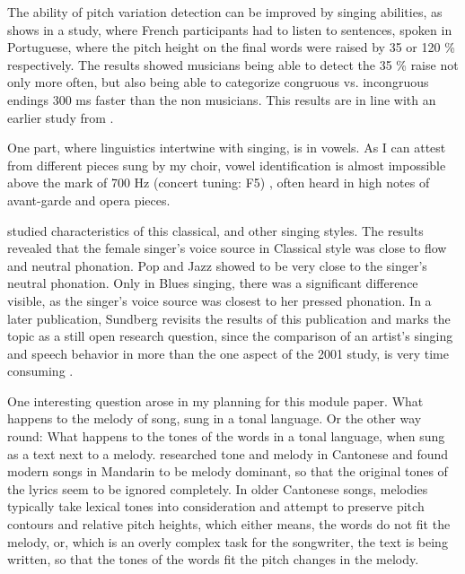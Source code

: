 The ability of pitch variation detection can be improved by singing abilities, as \cite{marques2007musicians} shows in a study, where French participants had to listen to sentences, spoken in Portuguese, where the pitch height on the final words were raised by 35 or 120 \% respectively. The results showed musicians being able to detect the 35 \% raise not only more often, but also being able to categorize congruous vs. incongruous endings 300 ms faster than the non musicians. This results are in line with an earlier study from \cite{schon2004music}.

One part, where linguistics intertwine with singing, is in vowels. As I can attest from different pieces sung by my choir, vowel identification is almost impossible above the mark of 700 Hz (concert tuning: F5) \cite{sundberg1977acoustics,sundberg2018phonetics}, often heard in high notes of avant-garde and opera pieces.

\cite{thalen2001describing} studied characteristics of this classical, and other singing styles. The results revealed that the female singer's voice source in Classical style was close to flow and neutral phonation. Pop and Jazz showed to be very close to the singer's neutral phonation. Only in Blues singing, there was a significant difference visible, as the singer's voice source was closest to her pressed phonation. In a later publication, Sundberg revisits the results of this publication and marks the topic as a still open research question, since the comparison of an artist's singing and speech behavior in more than the one aspect of the 2001 study, is very time consuming \cite{sundberg2003research}.

One interesting question arose in my planning for this module paper. What happens to the melody of song, sung in a tonal language. Or the other way round: What happens to the tones of the words in a tonal language, when sung as a text next to a melody. \cite{chan1987tone} researched tone and melody in Cantonese and found  modern songs in Mandarin to be melody dominant, so that the original tones of the lyrics seem to be ignored completely. In older Cantonese songs, melodies typically take lexical tones into consideration and attempt to preserve pitch contours and relative pitch heights, which either means, the words do not fit the melody, or, which is an overly complex task for the songwriter, the text is being written, so that the tones of the words fit the pitch changes in the melody.









